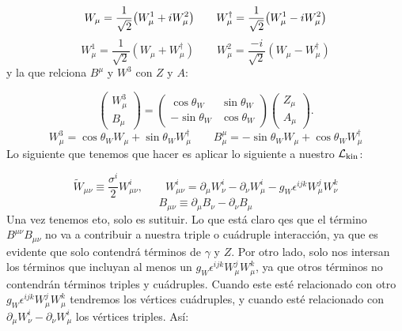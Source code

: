 \begin{equation}
	W_{\mu} = \frac{1}{\sqrt{2}} \pqty{W_{\mu}^1+iW_{\mu}^2} \qquad 
	W_{\mu}^\dagger = \frac{1}{\sqrt{2}} \pqty{W_{\mu}^1-iW_{\mu}^2}
\end{equation}
\begin{equation}
	W^1_{\mu} = \frac{1}{\sqrt{2}} (W_\mu + W_\mu^\dagger) \qquad 
	W^2_{\mu} = \frac{-i}{\sqrt{2}} (W_\mu - W_\mu^\dagger) \label{Ec:ej10-01}
\end{equation}
y la que relciona $B^\mu$ y $W^3$ con $Z$ y $A$:

\begin{equation}
\begin{pmatrix}
W_\mu^{3} \\[4pt]
B_\mu
\end{pmatrix}
=
\begin{pmatrix}
\cos\theta_W & \sin\theta_W \\[4pt]
-\sin\theta_W & \cos\theta_W
\end{pmatrix}
\begin{pmatrix}
Z_\mu \\[4pt]
A_\mu
\end{pmatrix}.
\end{equation}
\begin{equation}
	W^3_{\mu} =  \cos \theta_W W_\mu +\sin \theta_W W_\mu^\dagger \qquad 
	B^\mu_{\mu} = -\sin \theta_W W_\mu +\cos \theta_W W_\mu^\dagger
\end{equation}
Lo siguiente que tenemos que hacer es aplicar lo siguiente a nuestro $\mathcal{L}_{\text{kin}}$:

\begin{equation}
\widetilde{W}_{\mu\nu} \equiv \frac{\sigma^i}{2} W^i_{\mu\nu}, 
\qquad 
W^i_{\mu\nu} = \partial_\mu W^i_\nu - \partial_\nu W^i_\mu - g_W \epsilon^{ijk} W^j_\mu W^k_\nu
\end{equation}
\begin{equation}
B_{\mu\nu} \equiv \partial_\mu B_\nu - \partial_\nu B_\mu
\end{equation}
Una vez tenemos eto, solo es sutituir. Lo que está claro qes que el término $B^{\mu \nu} B_{\mu \nu} $ no va a contribuir a nuestra triple o cuádruple interacción, ya que es evidente que solo contendrá términos de $\gamma$ y $Z$. Por otro lado, solo nos intersan los términos que incluyan al menos un $g_W \epsilon^{ijk} W_{\mu}^j W_{\mu}^k$, ya que otros términos no contendrán términos triples y cuádruples. Cuando este esté relacionado con otro $g_W \epsilon^{ijk} W_{\mu}^j W_{\mu}^k$ tendremos los vértices cuádruples, y cuando esté relacionado con $\partial_\mu W^i_\nu-\partial_\nu W_\mu^i$ los vértices triples. Así: 

